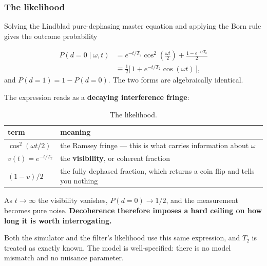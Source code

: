 \documentclass[12pt,a4paper]{article}
\begin{document}
\subsubsection{The likelihood}\label{sec:the-likelihood}
Solving the Lindblad pure-dephasing master equation and applying the Born rule gives the outcome probability

\begin{align}
P(d=0 \mid \omega, t)
  &= e^{-t/T_2}\cos^{2}\!\left(\frac{\omega t}{2}\right) + \frac{1 - e^{-t/T_2}}{2} \nonumber \\
  &\equiv \frac{1}{2}\bigl[\, 1 + e^{-t/T_2}\cos(\omega t) \,\bigr],
\label{eq:likelihood}
\end{align}
and $P(d=1) = 1 - P(d=0)$. The two forms are algebraically identical.

The expression reads as a \textbf{decaying interference fringe}:

\begin{table}[H]
  \centering
  \caption{The likelihood.}
  \label{tab:the-likelihood}
  \small
  \begin{tabular}{ll}
  \toprule
  term & meaning \\
  \midrule
  $\cos^2(\omega t/2)$ & the Ramsey fringe --- this is what carries information about $\omega$ \\
  $v(t) = e^{-t/T_2}$ & the \textbf{visibility}, or coherent fraction \\
  $(1-v)/2$ & the fully dephased fraction, which returns a coin flip and tells you nothing \\
  \bottomrule
  \end{tabular}
\end{table}
As $t \to \infty$ the visibility vanishes, $P(d=0) \to 1/2$, and the measurement becomes pure noise. \textbf{Decoherence therefore imposes a hard ceiling on how long it is worth interrogating.}

Both the simulator and the filter's likelihood use this same expression, and $T_2$ is treated as exactly known. The model is well-specified: there is no model mismatch and no nuisance parameter.
\end{document}
